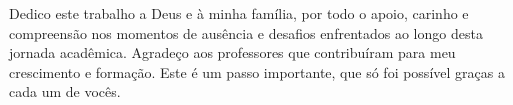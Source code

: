 
\begin{dedicatoria}%

Dedico este trabalho a Deus e à minha família, por todo o apoio, carinho e compreensão nos momentos de ausência e desafios enfrentados ao longo desta jornada acadêmica. Agradeço aos professores que contribuíram para meu crescimento e formação. Este é um passo importante, que só foi possível graças a cada um de vocês. 

\end{dedicatoria}
